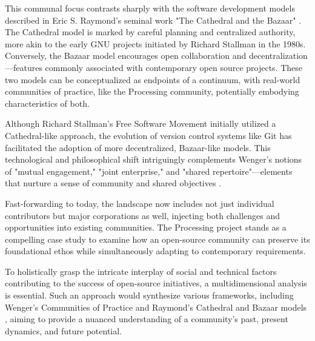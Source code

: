 \documentclass{article}
\begin{document}
This communal focus contrasts sharply with the software development models described in Eric S. Raymond's seminal work "The Cathedral and the Bazaar" \parencite{CathedralBazaarMusings2002a}. The Cathedral model is marked by careful planning and centralized authority, more akin to the early GNU projects initiated by Richard Stallman in the 1980s. Conversely, the Bazaar model encourages open collaboration and decentralization—features commonly associated with contemporary open source projects. These two models can be conceptualized as endpoints of a continuum, with real-world communities of practice, like the Processing community, potentially embodying characteristics of both.

Although Richard Stallman's Free Software Movement initially utilized a Cathedral-like approach, the evolution of version control systems like Git has facilitated the adoption of more decentralized, Bazaar-like models. This technological and philosophical shift intriguingly complements Wenger's notions of "mutual engagement," "joint enterprise," and "shared repertoire"—elements that nurture a sense of community and shared objectives \parencite{wengerCommunitiesPracticeLearning1998}.

Fast-forwarding to today, the landscape now includes not just individual contributors but major corporations as well, injecting both challenges and opportunities into existing communities. The Processing project stands as a compelling case study to examine how an open-source community can preserve its foundational ethos while simultaneously adapting to contemporary requirements.

To holistically grasp the intricate interplay of social and technical factors contributing to the success of open-source initiatives, a multidimensional analysis is essential. Such an approach would synthesize various frameworks, including Wenger's Communities of Practice \parencite{wengerCommunitiesPracticeLearning1998} and Raymond's Cathedral and Bazaar models \parencite{CathedralBazaarMusings2002a}, aiming to provide a nuanced understanding of a community's past, present dynamics, and future potential.

\end{document}
